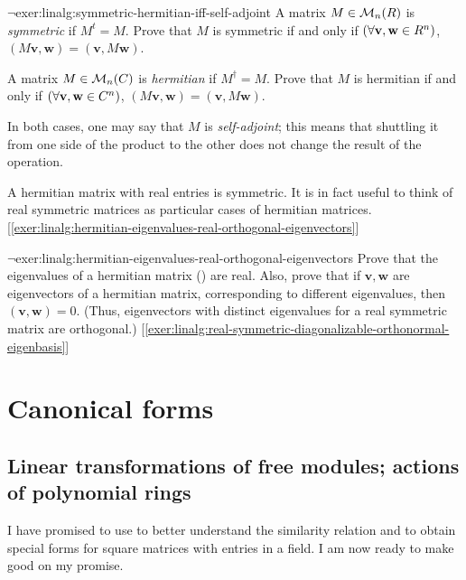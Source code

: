 \begin{exer}{$\lnot$}{exer:linalg:symmetric-hermitian-iff-self-adjoint}
  A matrix $M \in \mathcal{M}_n(R)$ is \emph{symmetric} if $M^t =
  M$. Prove that $M$ is symmetric if and only if
  $(\forall \mathbf{v}, \mathbf{w} \in R^n)$,
  $(M\mathbf{v}, \mathbf{w}) = (\mathbf{v}, M\mathbf{w})$.

  A matrix $M \in \mathcal{M}_n(C)$ is \emph{hermitian} if
  $M^\dagger = M$. Prove that $M$ is hermitian if and only if
  $(\forall \mathbf{v}, \mathbf{w} \in C^n)$,
  $(M\mathbf{v}, \mathbf{w}) = (\mathbf{v}, M\mathbf{w})$.

  In both cases, one may say that $M$ is \emph{self-adjoint}; this
  means that shuttling it from one side of the product to the other
  does not change the result of the operation.

  A hermitian matrix with real entries is symmetric. It is in fact
  useful to think of real symmetric matrices as particular cases of
  hermitian
  matrices. [\ref{exer:linalg:hermitian-eigenvalues-real-orthogonal-eigenvectors}]
\end{exer}
\begin{exer}{$\lnot$}{exer:linalg:hermitian-eigenvalues-real-orthogonal-eigenvectors}
  Prove that the eigenvalues of a hermitian matrix
  () are
  real. Also, prove that if $\mathbf{v}, \mathbf{w}$ are eigenvectors
  of a hermitian matrix, corresponding to different eigenvalues, then
  $(\mathbf{v}, \mathbf{w}) = 0$. (Thus, eigenvectors with distinct
  eigenvalues for a real symmetric matrix are orthogonal.)
  [\ref{exer:linalg:real-symmetric-diagonalizable-orthonormal-eigenbasis}]
\end{exer}

\section{Canonical forms}
\label{sec:linalg:canonical-forms}

\subsection{Linear transformations of free modules; actions of
  polynomial rings}
\label{subsec:linalg:linear-transformations-of-free-modules-actions-of-polynomial-rings}
I have promised to use  to better understand the
similarity relation and to obtain special forms for square matrices
with entries in a field. I am now ready to make good on my promise.

